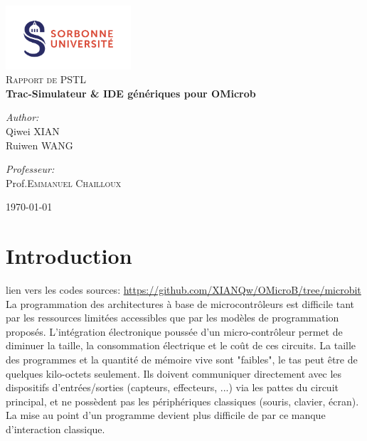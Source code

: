 \documentclass[14px]{article}
\begin{document}
\setlength{\parindent}{0pt}
\begin{titlepage}
	\begin{center}
		\includegraphics[width=0.35\textwidth]{logo.png}\\[1cm]
		\textsc{\Large Rapport de PSTL}\\[0.5cm]
		{ \huge \bfseries Trac-Simulateur \& IDE génériques pour OMicrob}\\[0.4cm]
		\begin{minipage}{0.4\textwidth}
			\begin{flushleft} \large
				\emph{Author:}\\
				Qiwei \textsc{XIAN}\\
				Ruiwen \textsc{WANG}\\
			\end{flushleft}
		\end{minipage}
		\begin{minipage}{0.4\textwidth}
			\begin{flushright} \large
				\emph{Professeur:} \\
				Prof.\textsc{Emmanuel Chailloux}
			\end{flushright}
		\end{minipage}
		\vfill
		{\large \today}
	\end{center}

\end{titlepage}
\clearpage

\tableofcontents
\thispagestyle{empty}
\clearpage

\pagestyle{fancy}
\rhead{\thepage}
\fancyfoot{}


\section{Introduction}

lien vers les codes sources:
\url{https://github.com/XIANQw/OMicroB/tree/microbit}\\


La programmation des architectures à base de microcontrôleurs est difficile tant par les ressources limitées accessibles que par les modèles de programmation proposés. L'intégration électronique poussée d'un micro-contrôleur permet de diminuer la taille, la consommation électrique et le coût de ces circuits. La taille des programmes et la quantité de mémoire vive sont "faibles", le tas peut être de quelques kilo-octets seulement. Ils doivent communiquer directement avec les dispositifs d'entrées/sorties (capteurs, effecteurs, ...) via les pattes du circuit principal, et ne possèdent pas les périphériques classiques (souris, clavier, écran). La mise au point d'un programme devient plus difficile de par ce manque d'interaction classique.\\
\end{document}
